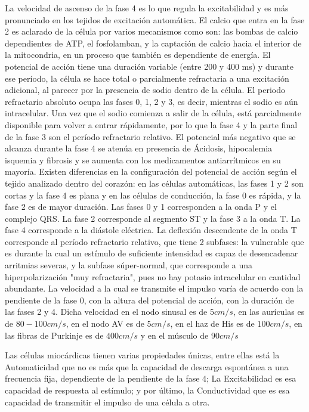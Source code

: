 \documentclass[12pt,letterpaper,oneside,openright]{book}
\begin{document}
	La velocidad de ascenso de la fase 4 es lo que regula la excitabilidad y es más pronunciado en los tejidos de excitación automática. El calcio que entra en la fase 2 es aclarado de la célula por varios mecanismos como son: las bombas de calcio dependientes de ATP, el fosfolamban, y la captación de calcio hacia el interior de la mitocondria, en un proceso que también es dependiente de energía. El potencial de acción tiene una duración variable (entre 200 y 400 ms) y durante ese período, la célula se hace total o parcialmente refractaria a una excitación adicional, al parecer por la presencia de sodio dentro de la célula. El periodo refractario absoluto ocupa las fases 0, 1, 2 y 3, es decir, mientras el sodio es aún intracelular. Una vez que el sodio comienza a salir de la célula, está parcialmente disponible para volver a entrar rápidamente, por lo que la fase 4 y la parte final de la fase 3 son el período refractario relativo. El potencial más negativo que se alcanza durante la fase 4 se atenúa en presencia de Ácidosis, hipocalemia isquemia y fibrosis y se aumenta con los medicamentos antiarrítmicos en su mayoría. Existen diferencias en la configuración del potencial de acción según el tejido analizado dentro del corazón: en las células automáticas, las fases 1 y 2 son cortas y la fase 4 es plana y en las células de conducción, la fase 0 es rápida, y la fase 2 es de mayor duración. Las fases 0 y 1 corresponden a la onda P y el complejo QRS. La fase 2 corresponde al segmento ST y la fase 3 a la onda T. La fase 4 corresponde a la diástole eléctrica. La deflexión descendente de la onda T corresponde al período refractario relativo, que tiene 2 subfases: la vulnerable que es durante la cual un estímulo de suficiente intensidad es capaz de desencadenar arritmias severas, y la subfase súper-normal, que corresponde a una hiperpolarización "muy refractaria", pues no hay potasio intracelular en cantidad abundante. La velocidad a la cual se transmite el impulso varía de acuerdo con la pendiente de la fase 0, con la altura del potencial de acción, con la duración de las fases 2 y 4. Dicha velocidad en el nodo sinusal es de $5 cm/s$, en las aurículas es de $80-100 cm/s$, en el nodo AV es de $5 cm/s$, en el haz de His es de $100 cm/s$, en las fibras de Purkinje es de $400 cm/s$ y en el músculo de $90 cm/s$
	
	Las células miocárdicas tienen varias propiedades únicas, entre ellas está la Automaticidad que no es más que la capacidad de descarga espontánea a una frecuencia fija, dependiente de la pendiente de la fase 4; La Excitabilidad es esa capacidad de respuesta al estímulo; y por último, la Conductividad que es esa capacidad de transmitir el impulso de una célula a otra.
	
\end{document}
